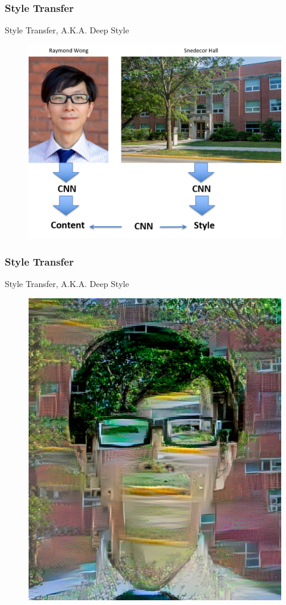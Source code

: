 \documentclass{beamer}
\begin{document}
\begin{frame}
	\frametitle{Style Transfer}
\begin{center}
Style Transfer, A.K.A. Deep Style
\end{center}
	\begin{figure}
		\includegraphics[width=0.8\linewidth]{Picture17}
	\end{figure}
\end{frame}
\begin{frame}
	\frametitle{Style Transfer}
\begin{center}
	Style Transfer, A.K.A. Deep Style
\end{center}
	\begin{figure}
		\includegraphics[width=0.5\linewidth]{style_transfer}
	\end{figure}
\end{frame}

%			
%			
\end{document}
